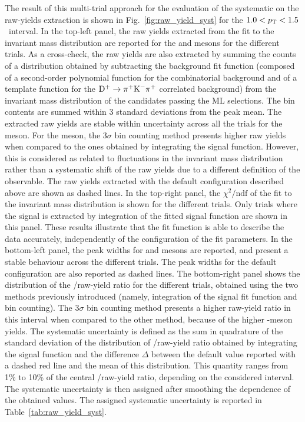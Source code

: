 The result of this multi-trial approach for the evaluation of the systematic on the raw-yields extraction is shown in Fig.~\ref{fig:raw_yield_syst} for the $1.0<p_\mathrm{T}<1.5$~\gevc interval. In the top-left panel, the raw yields extracted from the fit to the invariant mass distribution are reported for the \ds and \dpl mesons for the different trials. As a cross-check, the raw yields are also extracted by summing the counts of a distribution obtained by subtracting the background fit function (composed of a second-order polynomial function for the combinatorial background and of a template function for the $\mathrm{D^+}\rightarrow\mathrm{\pi^+K^-\pi^+}$ correlated background) from the invariant mass distribution of the candidates passing the ML selections. The bin contents are summed within 3 standard deviations from the peak mean. The extracted raw yields are stable within uncertainty across all the trials for the \dpl meson. For the \ds meson, the $3\sigma$ bin counting method presents higher raw yields when compared to the ones obtained by integrating the signal function. However, this is considered as related to fluctuations in the invariant mass distribution rather than a systematic shift of the raw yields due to a different definition of the observable. The raw yields extracted with the default configuration described above are shown as dashed lines. In the top-right panel, the $\chi^2/\mathrm{ndf}$ of the fit to the invariant mass distribution is shown for the different trials. Only trials where the signal is extracted by integration of the fitted signal function are shown in this panel. These results illustrate that the fit function is able to describe the data accurately, independently of the configuration of the fit parameters. In the bottom-left panel, the peak widths for \ds and \dpl mesons are reported, and present a stable behaviour across the different trials. The peak widths for the default configuration are also reported as dashed lines. The bottom-right panel shows the distribution of the \ds/\dpl raw-yield ratio for the different trials, obtained using the two methods previously introduced (namely, integration of the signal fit function and bin counting). The $3\sigma$ bin counting method presents a higher raw-yield ratio in this \pt interval when compared to the other method, because of the higher \ds-meson yields. The systematic uncertainty is defined as the sum in quadrature of the standard deviation of the distribution of \ds/\dpl raw-yield ratio obtained by integrating the signal function and the difference $\Delta$ between the default value reported with a dashed red line and the mean of this distribution. This quantity ranges from 1\% to 10\% of the central \ds/\dpl raw-yield ratio, depending on the considered \pt interval. The systematic uncertainty is then assigned after smoothing the \pt dependence of the obtained values. The assigned systematic uncertainty is reported in Table~\ref{tab:raw_yield_syst}.




